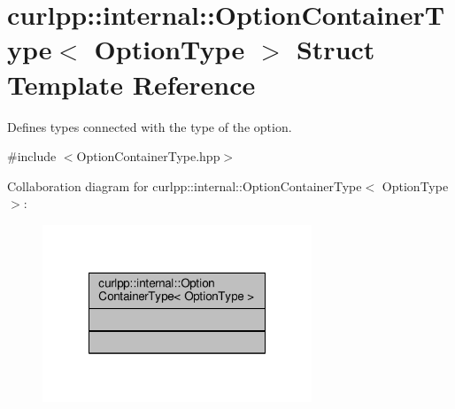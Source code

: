 \hypertarget{structcurlpp_1_1internal_1_1OptionContainerType}{\section{curlpp\-:\-:internal\-:\-:Option\-Container\-Type$<$ Option\-Type $>$ Struct Template Reference}
\label{structcurlpp_1_1internal_1_1OptionContainerType}
}


Defines types connected with the type of the option.  




{\ttfamily \#include $<$Option\-Container\-Type.\-hpp$>$}



Collaboration diagram for curlpp\-:\-:internal\-:\-:Option\-Container\-Type$<$ Option\-Type $>$\-:\nopagebreak
\begin{figure}[H]
\begin{center}
\leavevmode
\includegraphics[width=228pt]{structcurlpp_1_1internal_1_1OptionContainerType__coll__graph}
\end{center}
\end{figure}
